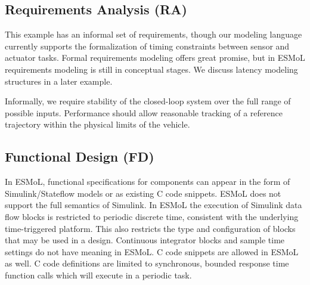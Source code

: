 \subsection{Requirements Analysis (RA)}


This example has an informal set of requirements, though our modeling language currently supports the 
formalization of timing constraints between sensor and actuator tasks.  Formal requirements modeling 
offers great promise, but in ESMoL requirements modeling is still in conceptual stages.  We discuss latency modeling structures in a later example.


Informally, we require stability of the closed-loop system over the full range
of possible inputs.  Performance should allow reasonable tracking of a reference
trajectory within the physical limits of the vehicle.

\subsection{Functional Design (FD)}


In ESMoL, functional specifications for components can appear in the form of Simulink/Stateflow models or 
as existing C code snippets.  ESMoL does not support the full semantics of Simulink. In ESMoL the execution 
of Simulink data flow blocks is restricted to periodic discrete time, consistent with the underlying 
time-triggered platform.  This also restricts the type and configuration of blocks that may be used in a 
design.  Continuous integrator blocks and sample time settings do not have meaning in ESMoL.  C code 
snippets are allowed in ESMoL as well.  C code definitions are limited to synchronous, bounded response 
time function calls which will execute in a periodic task.

